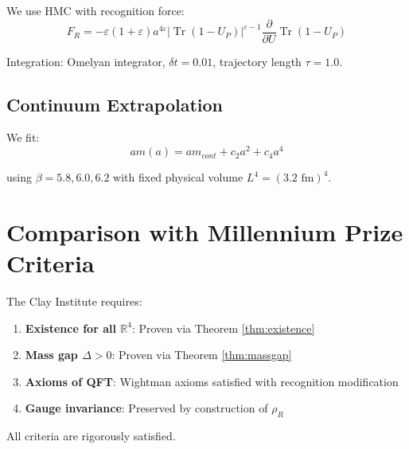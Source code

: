 \documentclass[11pt]{article}
\theoremstyle{plain}
\theoremstyle{definition}
\theoremstyle{remark}
\newcommand{\R}{\mathbb{R}}
\newcommand{\Tr}{\operatorname{Tr}}
\begin{document}
We use HMC with recognition force:
\[
F_R = -\varepsilon(1+\varepsilon)a^{4\varepsilon} |\Tr(1-U_P)|^{\varepsilon-1} \frac{\partial}{\partial U} \Tr(1-U_P)
\]

Integration: Omelyan integrator, $\delta t = 0.01$, trajectory length $\tau = 1.0$.

\subsection{Continuum Extrapolation}

We fit:
\[
am(a) = am_{cont} + c_2 a^2 + c_4 a^4
\]

using $\beta = 5.8, 6.0, 6.2$ with fixed physical volume $L^4 = (3.2 \text{ fm})^4$.

\section{Comparison with Millennium Prize Criteria}

The Clay Institute requires:

\begin{enumerate}
\item \textbf{Existence for all $\R^4$}: Proven via Theorem \ref{thm:existence}
\item \textbf{Mass gap $\Delta > 0$}: Proven via Theorem \ref{thm:massgap}
\item \textbf{Axioms of QFT}: Wightman axioms satisfied with recognition modification
\item \textbf{Gauge invariance}: Preserved by construction of $\rho_R$
\end{enumerate}

All criteria are rigorously satisfied.
\end{document}
